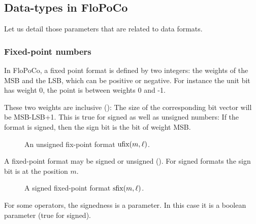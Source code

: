 \documentclass{article}
\begin{document}
\subsection{Data-types in FloPoCo\label{sec:data-types}}
Let us detail those parameters that are related to data formats.
\subsubsection{Fixed-point numbers}
In FloPoCo, a fixed point format is defined by two integers: the weights of the MSB and the LSB, which can be positive or negative. 
For instance the unit bit has weight 0, the point is between weights 0 and -1. 

These two weights are inclusive (): The size of the corresponding bit vector will be MSB-LSB+1.
This is true for signed as well as unsigned numbers: If the format is signed, then the sign bit is the bit of weight MSB.

  \begin{figure}[h!]
  \begin{center}
  \end{center}
    \vspace{-2ex}
  \caption{An unsigned fix-point format $\text{ufix}(m,\ell)$.}
  \label{fig:ufixformat}
\end{figure}


A fixed-point format may be signed or unsigned ().
For signed formats the sign bit is at the position $m$.

\begin{figure}[h!]
  \begin{center}
    \end{center}
    \vspace{-2ex}
  \caption{A signed fixed-point format $\text{sfix}(m,\ell)$.}
  \label{fig:sfixformat}
\end{figure}

For some operators, the signedness is a parameter. In this case it is a boolean  parameter (true for signed).
\end{document}
